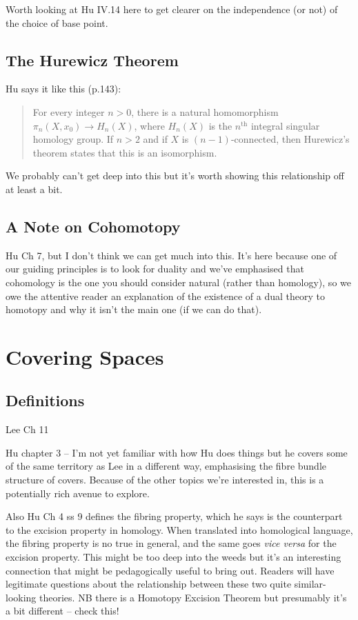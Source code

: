 \documentclass[oneside,english]{amsbook}
\numberwithin{section}{chapter}
\theoremstyle{plain}
\theoremstyle{definition}
\begin{document}
	Worth looking at Hu IV.14 here to get clearer on the independence (or not) of the choice of base point.

	\section{The Hurewicz Theorem}
	
	Hu says it like this (p.143):
	\begin{quote}
		For every integer $n > 0$, there is a natural homomorphism $\pi_n(X, x_0)\to H_n(X)$, where $H_n(X)$ is the $n^\text{th}$ integral singular homology group. If $n > 2$ and if $X$ is $(n - 1)$-connected, then Hurewicz's theorem states that this is an isomorphism. 
	\end{quote}
	
	We probably can't get deep into this but it's worth showing this relationship off at least a bit.
	
	\section{A Note on Cohomotopy}
	
	Hu Ch 7, but I don't think we can get much into this. It's here because one of our guiding principles is to look for duality and we've emphasised that cohomology is the one you should consider natural (rather than homology), so we owe the attentive reader an explanation of the existence of a dual theory to homotopy and why it isn't the main one (if we can do that).	

	\chapter{Covering Spaces}
	
	\section{Definitions}
	
	Lee Ch 11
	
	Hu chapter 3 -- I'm not yet familiar with how Hu does things but he covers some of the same territory as Lee in a different way, emphasising the fibre bundle structure of covers. Because of the other topics we're interested in, this is a potentially rich avenue to explore.
	
	Also Hu Ch 4 ss 9 defines the fibring property, which he says is the counterpart to the excision property in homology. When translated into homological language, the fibring property is no true in general, and the same goes \emph{vice versa} for the excision property. This might be too deep into the weeds but it's an interesting connection that might be pedagogically useful to bring out. Readers will have legitimate questions about the relationship between these two quite similar-looking theories. NB there is a Homotopy Excision Theorem but presumably it's a bit different -- check this!
\end{document}
